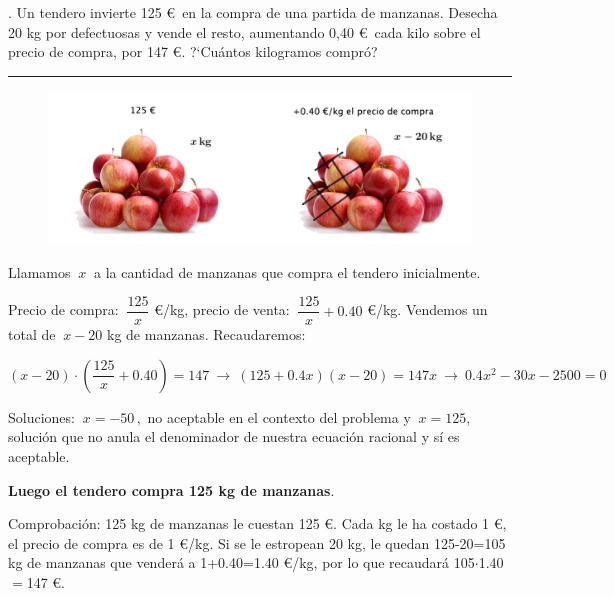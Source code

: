 \begin{miejercicio}
. Un tendero invierte 125 \euro $\,$ en la compra de una partida de manzanas. Desecha 20 kg por defectuosas y vende el resto, aumentando 0,40 \euro $\,$ cada kilo sobre el precio de compra, por 147 \euro. ?`Cuántos kilogramos compró?

\rule{250pt}{0.1pt}

\begin{figure}[H]
	\centering
	\includegraphics[width=.8\textwidth]{img-ecc/ecc04.png}
\end{figure}
Llamamos $ \ x \ $ a la cantidad de manzanas que compra el tendero inicialmente.

\vspace{2mm} Precio de compra: $\ \dfrac{125}{x}$ \euro/kg, precio de venta: $\ \dfrac{125}{x}+0.40$ \euro/kg. Vendemos un total de $\ x-20$ kg de manzanas. Recaudaremos:

\vspace{2mm} $(x-20)\cdot \left( \dfrac{125}{x}+0.40 \right) = 147 \ \to \ (125+0.4x)(x-20)=147 x \ \to \ 0.4x^2-30x-2500=0$

\vspace{2mm} Soluciones: $ \ x=-50\, , $ no aceptable en el contexto del problema y $\ x=125$, solución que no anula el denominador de nuestra ecuación racional y sí es aceptable.

\vspace{2mm} \textbf{Luego el tendero compra 125 kg de manzanas}.

\vspace{2mm} Comprobación: 125 kg de manzanas le cuestan 125 \euro. Cada kg le ha costado 1 \euro, el precio de compra es de 1 \euro/kg. Si se le estropean 20 kg, le quedan 125-20=105 kg de manzanas que venderá a 1+0.40=1.40 \euro/kg, por lo que recaudará 105$\cdot$1.40$=$147 \euro.

\end{miejercicio}

